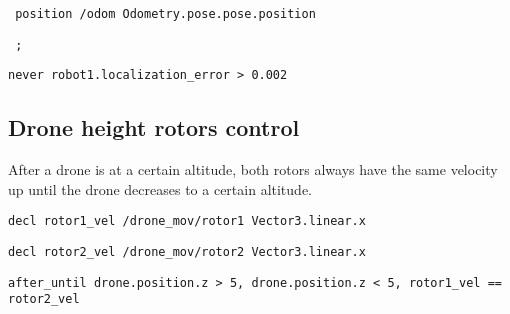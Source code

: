 \texttt{    position /odom Odometry.pose.pose.position}

\texttt{    ;}

\texttt{never robot1.localization\_error > 0.002}


\subsection{Drone height rotors control}
\label{ssec:rotorsexample}

After a drone is at a certain altitude, both rotors always have the same velocity up until the drone decreases to a certain altitude.

\texttt{decl rotor1\_vel /drone\_mov/rotor1 Vector3.linear.x}

\texttt{decl rotor2\_vel /drone\_mov/rotor2 Vector3.linear.x}

\texttt{after\_until drone.position.z > 5, drone.position.z < 5, rotor1\_vel == rotor2\_vel}
